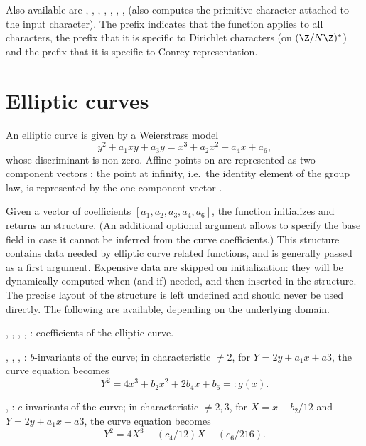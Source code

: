 Also available are ,  , ,
, , , ,
 (also computes the primitive character attached to
the input character). The prefix  indicates that the function
applies to all characters, the prefix  that it is specific to
Dirichlet characters (on $(\Z/N\Z)^*$) and the prefix  that it
is specific to Conrey representation.

\bigskip


\section{Elliptic curves}

An elliptic curve is given by a Weierstrass model
$$
  y^2+a_1xy+a_3y=x^3+a_2x^2+a_4x+a_6,
$$
whose discriminant is non-zero. Affine points on  are represented as
two-component vectors \kbd{[x,y]}; the point at infinity, i.e.~the identity
element of the group law, is represented by the one-component vector
\kbd{[0]}.

Given a vector of coefficients $[a_1,a_2,a_3,a_4,a_6]$, the function
 initializes and returns an  structure. (An additional
optional argument allows to specify the base field in case it cannot be
inferred from the curve coefficients.) This structure contains data needed by
elliptic curve related functions, and is generally passed as a first argument.
Expensive data are skipped on initialization: they will be dynamically
computed when (and if) needed, and then inserted in the structure. The
precise layout of the  structure is left undefined and should never
be used directly. The following  are available,
depending on the underlying domain.


\item {}, , , , : coefficients of the
elliptic curve.

\item {}, , , : $b$-invariants of the curve; in
characteristic $\neq 2$, for $Y = 2y + a_1x+a3$, the curve equation becomes
$$ Y^2 = 4 x^3 + b_2 x^2 + 2b_4 x + b_6 =: g(x). $$

\item {}, : $c$-invariants of the curve; in characteristic $\neq
2,3$, for $X = x + b_2/12$ and $Y = 2y + a_1x+a3$, the curve equation becomes
$$ Y^2 = 4 X^3 - (c_4/12) X - (c_6/216). $$

